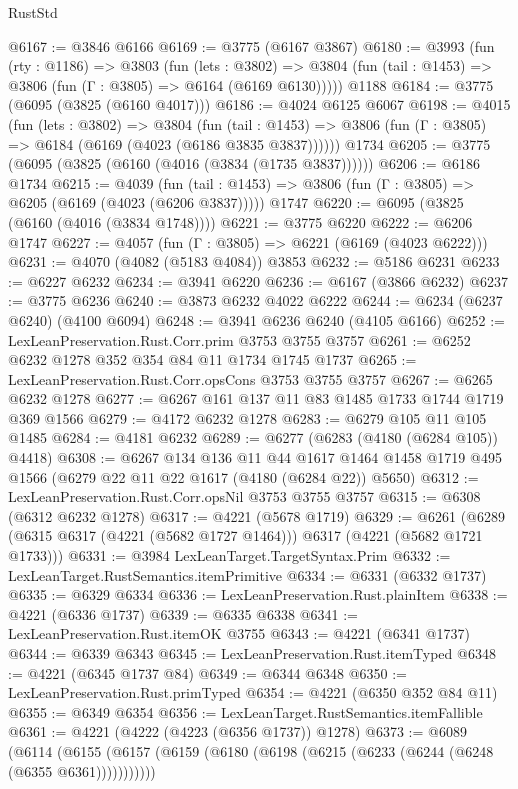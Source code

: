 \begin{lexlean}{RustStd}
\begin{coremodule}
@6167 := @3846 @6166
@6169 := @3775 (@6167 @3867)
@6180 := @3993
    (fun (rty : @1186) =>
    @3803
      (fun (lets : @3802) =>
      @3804 (fun (tail : @1453) => @3806 (fun (Γ : @3805) => @6164 (@6169 @6130)))))
    @1188
@6184 := @3775 (@6095 (@3825 (@6160 @4017)))
@6186 := @4024 @6125 @6067
@6198 := @4015
    (fun (lets : @3802) =>
    @3804
      (fun (tail : @1453) => @3806 (fun (Γ : @3805) => @6184 (@6169 (@4023 (@6186 @3835 @3837))))))
    @1734
@6205 := @3775 (@6095 (@3825 (@6160 (@4016 (@3834 (@1735 @3837))))))
@6206 := @6186 @1734
@6215 := @4039
    (fun (tail : @1453) => @3806 (fun (Γ : @3805) => @6205 (@6169 (@4023 (@6206 @3837)))))
    @1747
@6220 := @6095 (@3825 (@6160 (@4016 (@3834 @1748))))
@6221 := @3775 @6220
@6222 := @6206 @1747
@6227 := @4057 (fun (Γ : @3805) => @6221 (@6169 (@4023 @6222)))
@6231 := @4070 (@4082 (@5183 @4084)) @3853
@6232 := @5186 @6231
@6233 := @6227 @6232
@6234 := @3941 @6220
@6236 := @6167 (@3866 @6232)
@6237 := @3775 @6236
@6240 := @3873 @6232 @4022 @6222
@6244 := @6234 (@6237 @6240) (@4100 @6094)
@6248 := @3941 @6236 @6240 (@4105 @6166)
@6252 := LexLeanPreservation.Rust.Corr.prim @3753 @3755 @3757
@6261 := @6252 @6232 @1278 @352 @354 @84 @11 @1734 @1745 @1737
@6265 := LexLeanPreservation.Rust.Corr.opsCons @3753 @3755 @3757
@6267 := @6265 @6232 @1278
@6277 := @6267 @161 @137 @11 @83 @1485 @1733 @1744 @1719 @369 @1566
@6279 := @4172 @6232 @1278
@6283 := @6279 @105 @11 @105 @1485
@6284 := @4181 @6232
@6289 := @6277 (@6283 (@4180 (@6284 @105)) @4418)
@6308 := @6267
    @134
    @136
    @11
    @44
    @1617
    @1464
    @1458
    @1719
    @495
    @1566
    (@6279 @22 @11 @22 @1617 (@4180 (@6284 @22)) @5650)
@6312 := LexLeanPreservation.Rust.Corr.opsNil @3753 @3755 @3757
@6315 := @6308 (@6312 @6232 @1278)
@6317 := @4221 (@5678 @1719)
@6329 := @6261 (@6289 (@6315 @6317 (@4221 (@5682 @1727 @1464))) @6317 (@4221 (@5682 @1721 @1733)))
@6331 := @3984 LexLeanTarget.TargetSyntax.Prim
@6332 := LexLeanTarget.RustSemantics.itemPrimitive
@6334 := @6331 (@6332 @1737)
@6335 := @6329 @6334
@6336 := LexLeanPreservation.Rust.plainItem
@6338 := @4221 (@6336 @1737)
@6339 := @6335 @6338
@6341 := LexLeanPreservation.Rust.itemOK @3755
@6343 := @4221 (@6341 @1737)
@6344 := @6339 @6343
@6345 := LexLeanPreservation.Rust.itemTyped
@6348 := @4221 (@6345 @1737 @84)
@6349 := @6344 @6348
@6350 := LexLeanPreservation.Rust.primTyped
@6354 := @4221 (@6350 @352 @84 @11)
@6355 := @6349 @6354
@6356 := LexLeanTarget.RustSemantics.itemFallible
@6361 := @4221 (@4222 (@4223 (@6356 @1737)) @1278)
@6373 := @6089
    (@6114 (@6155 (@6157 (@6159 (@6180 (@6198 (@6215 (@6233 (@6244 (@6248 (@6355 @6361)))))))))))

\end{coremodule}
\end{lexlean}
